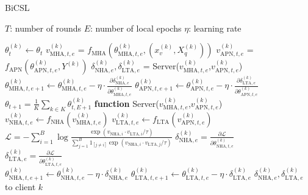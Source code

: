 \documentclass[letterpaper]{article} %
\begin{document}
\begin{algorithm}[!t]
\caption{BiCSL}
\label{BiCSL}
\begin{algorithmic}[1]
\STATE $T$: number of rounds
\STATE $E$: number of local epochs
\STATE $\eta$: learning rate

       \STATE $\theta_{t}^{(k)}\leftarrow \theta_{t}$
       \ENDFOR
            \STATE $v_{\text{MHA},t,e}^{(k)}$ = $f_{\text{MHA}}(\theta_{\text{MHA},t,e}^{(k)},(x_v^{(k)}, X_q^{(k)}))$
            \STATE $v_{\text{APN},t,e}^{(k)}$ = $f_{\text{APN}}(\theta_{\text{APN},t,e}^{(k)},Y^{(k)})$
            \STATE $\delta_{\text{NHA},e}^{(k)},\delta_{\text{LTA},e}^{(k)}$ = Server($v_{\text{MHA},t,e}^{(k)}$,$v_{\text{APN},t,e}^{(k)}$)
            \STATE $\theta_{\text{MHA},t,e+1}^{(k)} \leftarrow \theta_{\text{MHA},t,e}^{(k)}-\eta\cdot \frac{\partial \delta_{\text{NHA},e}^{(k)}}{\partial \theta_{\text{MHA},t,e}^{(k)}}$
            \STATE $\theta_{\text{APN},t,e+1}^{(k)} \leftarrow \theta_{\text{APN},t,e}^{(k)}-\eta\cdot \frac{\partial \delta_{\text{LTA},e}^{(k)}}{\partial \theta_{\text{APN},t,e}^{(k)}}$\
        \ENDFOR
   \ENDFOR
   \STATE $\theta_{t+1} = \frac{1}{K}\sum_{k\in K}\theta_{t,E+1}^{(k)}$
   \ENDFOR
\ENDFOR
\STATE
\STATE \textbf{function} Server($v_{\text{MHA},t,e}^{(k)}$,$v_{\text{APN},t,e}^{(k)}$)
\STATE $v_{\text{NHA},t,e}^{(k)} \leftarrow f_{\text{NHA}}(v_{\text{MHA},t,e}^{(k)})$  
\STATE $v_{\text{LTA},t,e}^{(k)} \leftarrow f_{\text{LTA}}(v_{\text{APN},t,e}^{(k)})$  
\STATE $\mathcal{L}= -\sum_{i=1}^{B}\log\frac{\exp(v_{\text{NHA},i} \cdot v_{\text{LTA},i} / \tau)}{\sum_{j=1}^{B} {1}_{[j \neq i]} \exp(v_{\text{NHA},i} \cdot v_{\text{LTA},j} / \tau)}$
\STATE $\delta_{\text{NHA},e}^{(k)}=\frac{\partial\mathcal{L}}{\partial \theta_{\text{NHA},t,e}^{(k)}}$\\
\STATE $\delta_{\text{LTA},e}^{(k)}=\frac{\partial\mathcal{L}}{\partial \theta_{\text{LTA},t,e}^{(k)}}$\\
\STATE $\theta_{\text{NHA},t,e+1}^{(k)}\leftarrow \theta_{\text{NHA},t,e}^{(k)}-\eta\cdot \delta_{\text{NHA},e}^{(k)}$
\STATE $\theta_{\text{LTA},t,e+1}^{(k)}\leftarrow \theta_{\text{LTA},t,e}^{(k)}-\eta\cdot \delta_{\text{LTA},e}^{(k)}$
\RETURN $\delta_{\text{NHA},e}^{(k)},\delta_{\text{LTA},e}^{(k)}$ to client $k$
\end{algorithmic}
\end{algorithm}
\end{document}

